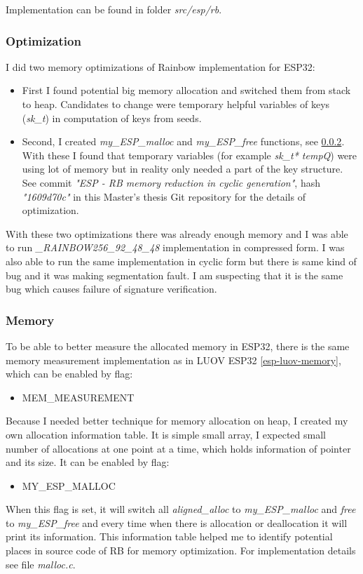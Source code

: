\documentclass[thesis=M,english]{FITthesis}[2019/12/23]
\begin{document}
\bigskip
\noindent
Implementation can be found in folder \textit{src/esp/rb}. 

\subsubsection{Optimization} \label{rb-opti}
I did two memory optimizations of Rainbow implementation for ESP32:
\begin{itemize}
\item	First I found potential big memory allocation and switched them from stack to heap. Candidates to change were temporary helpful variables of keys (\textit{sk\_t}) in computation of keys from seeds.

\item	Second, I created \textit{my\_ESP\_malloc} and \textit{my\_ESP\_free} functions, see \ref{esp-rb-memory}. With these I found that temporary variables (for example \textit{sk\_t* tempQ}) were using lot of memory but in reality only needed a part of the key structure. See commit \textit{"ESP - RB memory reduction in cyclic generation"}, hash \textit{"1609d70c"} in this Master's thesis Git repository for the details of optimization.
\end{itemize}

With these two optimizations there was already enough memory and I was able to run \textit{\_RAINBOW256\_92\_48\_48} implementation in compressed form. I was also able to run the same implementation in cyclic form but there is same kind of bug and it was making segmentation fault. I am suspecting that it is the same bug 
which causes failure of signature verification.

\subsubsection{Memory} \label{esp-rb-memory}
To be able to better measure the allocated memory in ESP32, there is the same memory measurement implementation as in LUOV ESP32 \ref{esp-luov-memory}, which can be enabled by flag:
\begin{itemize}
\item	MEM\_MEASUREMENT
\end{itemize}

Because I needed better technique for memory allocation on heap, I created my own allocation information table. It is simple small array, I expected small number of allocations at one point at a time, which holds information of pointer and its size.
It can be enabled by flag:
\begin{itemize}
\item	MY\_ESP\_MALLOC
\end{itemize}
When this flag is set, it will switch all \textit{aligned\_alloc} to \textit{my\_ESP\_malloc} and \textit{free} to \textit{my\_ESP\_free} and every time when there is allocation or deallocation it will print its information.
This information table helped me to identify potential places in source code of RB for memory optimization. For implementation details see file \textit{malloc.c}.
\end{document}

